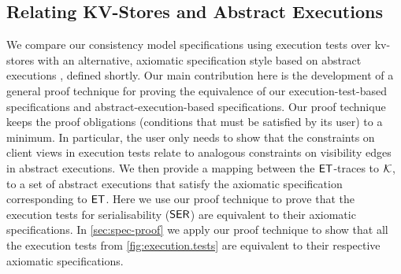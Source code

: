 %
%
%
%
%
\subsection{Relating KV-Stores and Abstract Executions}
We compare our consistency model specifications using execution tests over kv-stores 
with an alternative, axiomatic specification style based on abstract 
executions \cite{framework-concur}, defined shortly. 
Our main contribution here is the development of a general proof technique for proving the equivalence of our execution-test-based specifications and abstract-execution-based specifications.
Our proof technique keeps the proof obligations (conditions that must be satisfied by its user) to a minimum. 
In particular, the user only needs to show that the constraints on client views in execution tests relate to analogous constraints on visibility edges in abstract executions.
We then provide a mapping between the $\mathsf{ET}$-traces to 
$\mathcal{K}$, to a set of abstract executions that satisfy the axiomatic specification corresponding to $\mathsf{ET}$.
Here we use our proof technique to prove that the execution 
tests for serialisability ($\mathsf{SER}$) are equivalent to their 
axiomatic specifications. In \cref{sec:spec-proof} we apply our proof technique 
to show that all the execution tests from \cref{fig:execution.tests} are equivalent 
to their respective axiomatic specifications. 

